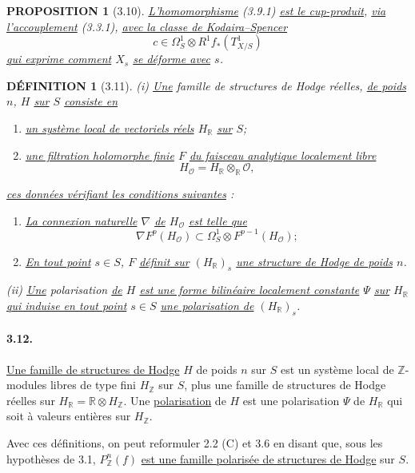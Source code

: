 \documentclass[10pt,leqno]{article}
\newcommand{\R}{\mathbb R}
\newcommand{\Z}{\mathbb Z}
\newcommand{\cO}{\mathcal O}
\theoremstyle{deligne}
\newtheorem*{definition}{DÉFINITION}
\newtheorem*{proposition}{PROPOSITION}\newtheorem*{corollaire}{COROLLAIRE}\newtheorem*{theoremeMonodromie}{THÉORÈME DE MONODROMIE}
\renewcommand{\underline}[1]{\uline{#1}}
\begin{document}
\begin{proposition}[3.10]
\underline{L'homomorphisme} (3.9.1) \underline{est le cup-produit}, \underline{via l'accouplement} (3.3.1), \underline{avec la classe de Kodaira--Spencer}
\[
c\in\Omega_S^1\otimes R^1f_*(T^1_{X/S})
\]
\underline{qui exprime comment} $X_s$ \underline{se déforme avec} $s$.
\end{proposition}

\begin{definition}[3.11]
(i) \underline{Une} famille de structures de Hodge réelles, \underline{de poids} $n$, $H$ \underline{sur} $S$ \underline{consiste en}
\begin{enumerate}[label=\alph*)]
\item \underline{un système local de vectoriels réels} $H_\R$ \underline{sur} $S$;
\item \underline{une filtration holomorphe finie} $F$ \underline{du faisceau analytique localement libre}
\[
H_\cO=H_\R\otimes_\R\cO,
\]
\end{enumerate}
\underline{ces données vérifiant les conditions suivantes} :
\begin{enumerate}[label=(H.\arabic*)]
\item \underline{La connexion naturelle} $\nabla$ \underline{de} $H_\cO$ \underline{est telle que}
\[
\nabla F^p(H_\cO)\subset \Omega_S^1\otimes F^{p-1}(H_\cO);
\]
\item \underline{En tout point} $s\in S$, $F$ \underline{définit sur} $(H_\R)_s$ \underline{une structure de Hodge de poids} $n$.
\end{enumerate}
(ii) \underline{Une} polarisation \underline{de} $H$ \underline{est une forme bilinéaire localement constante} $\Psi$ \underline{sur} $H_\R$ \underline{qui induise en tout point} $s\in S$ \underline{une polarisation de} $(H_\R)_s$.
\end{definition}

\paragraph{3.12.}
\underline{Une famille de structures de Hodge} $H$ de poids $n$ sur $S$ est un système local de $\Z$-modules libres de type fini $H_\Z$ sur $S$, plus une famille de structures de Hodge réelles sur $H_\R=\R\otimes H_\Z$. Une \underline{polarisation} de $H$ est une polarisation $\Psi$ de $H_\R$ qui soit à valeurs entières sur $H_\Z$.

Avec ces définitions, on peut reformuler 2.2 (C) et 3.6 en disant que, sous les hypothèses de 3.1, $P_\Z^n(f)$ \underline{est une famille polarisée de structures de Hodge} sur $S$.
\end{document}
